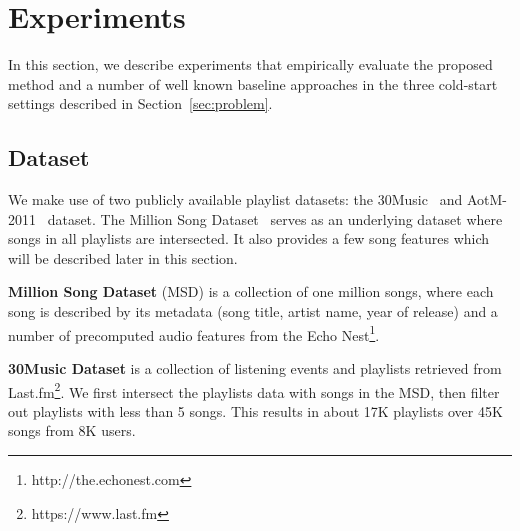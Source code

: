 \section{Experiments}
\label{sec:experiment}


In this section, we describe experiments that empirically evaluate the proposed method and a number of 
well known baseline approaches in the three cold-start settings described in Section~\ref{sec:problem}.


\subsection{Dataset}
We make use of two publicly available playlist datasets: the 30Music~\cite{30music2015} and AotM-2011~\cite{mcfee2012hypergraph} dataset.
The Million Song Dataset~\cite{msd2011} serves as an underlying dataset where songs in all playlists are intersected.
It also provides a few song features which will be described later in this section.

\begin{table}[hbt]
\centering
\caption{Music playlist dataset}
\label{tab:stats_pldata}
\end{table}

\noindent
{\bf Million Song Dataset} (MSD) is a collection of one million songs, where each song is described by its metadata 
(\eg song title, artist name, year of release) and a number of precomputed audio features from the Echo Nest\footnote{http://the.echonest.com}.

\noindent
{\bf 30Music Dataset} is a collection of listening events and playlists retrieved from Last.fm\footnote{https://www.last.fm}.
We first intersect the playlists data with songs in the MSD, 
then filter out playlists with less than 5 songs.
This results in about 17K playlists over 45K songs from 8K users.

